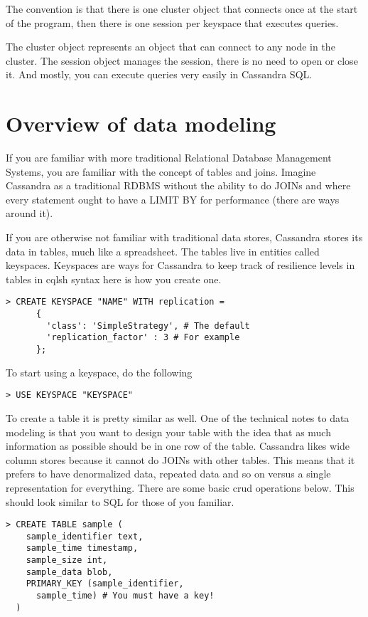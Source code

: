 \documentclass[9pt,twocolumn,twoside]{idsi}
\begin{document}
The convention is that there is one cluster object that connects once at the start of the program, then there is one session per keyspace that executes queries.

The cluster object represents an object that can connect to any node in the cluster. The session object manages the session, there is no need to open or close it. And mostly, you can execute queries very easily in Cassandra SQL.

\section{Overview of data modeling}

If you are familiar with more traditional Relational Database Management Systems, you are familiar with the concept of tables and joins. Imagine Cassandra as a traditional RDBMS without the ability to do JOINs and where every statement ought to have a LIMIT BY for performance (there are ways around it).

If you are otherwise not familiar with traditional data stores, Cassandra stores its data in tables, much like a spreadsheet. The tables live in entities called keyspaces. Keyspaces are ways for Cassandra to keep track of resilience levels in tables in cqlsh syntax here is how you create one.

\begin{lstlisting}[breaklines]
> CREATE KEYSPACE "NAME" WITH replication = 
      {
        'class': 'SimpleStrategy', # The default 
        'replication_factor' : 3 # For example
      };
\end{lstlisting}

To start using a keyspace, do the following

\begin{lstlisting}[breaklines]
> USE KEYSPACE "KEYSPACE"
\end{lstlisting}

To create a table it is pretty similar as well. One of the technical notes to data modeling is that you want to design your table with the idea that as much information as possible should be in one row of the table. Cassandra likes wide column stores because it cannot do JOINs with other tables. This means that it prefers to have denormalized data, repeated data and so on versus a single representation for everything. There are some basic crud operations below. This should look similar to SQL for those of you familiar.

\begin{lstlisting}[breaklines]
> CREATE TABLE sample (
    sample_identifier text,
    sample_time timestamp,
    sample_size int,
    sample_data blob,
    PRIMARY_KEY (sample_identifier, 
      sample_time) # You must have a key!
  )
\end{lstlisting}
\end{document}
